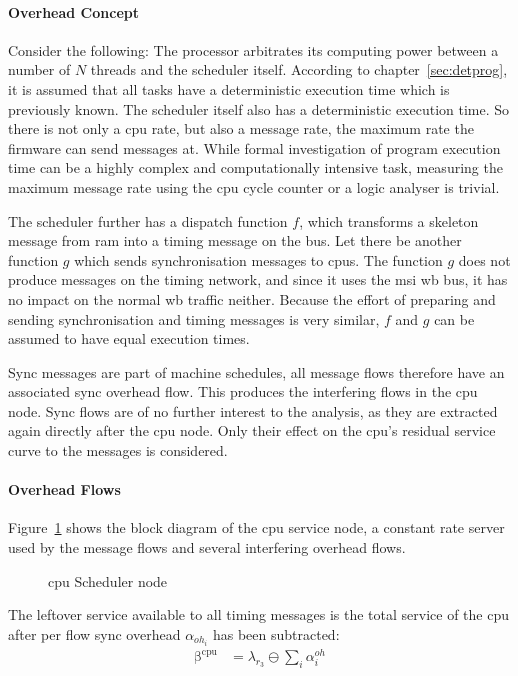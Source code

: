 \paragraph{Overhead Concept}
Consider the following: The processor arbitrates its computing power between a number of $N$ threads and the scheduler itself.
According to chapter~\ref{sec:detprog}, it is assumed that all tasks have a deterministic execution time which is previously known.
The scheduler itself also has a deterministic execution time.
So there is not only a \gls{cpu} rate, but also a message rate, the maximum rate the firmware can send messages at.
While formal investigation of program execution time can be a highly complex and computationally intensive task, measuring the maximum message rate using the \gls{cpu} cycle counter
or a logic analyser is trivial.
\par
The scheduler further has a dispatch function $f$, which transforms a skeleton message from \gls{ram}
into a timing message on the bus. Let there be another function $g$ which sends synchronisation messages to \gls{cpu}s.
The function $g$ does not produce messages on the timing network, and since it uses the \gls{msi} \gls{wb} bus, it has no impact on the normal \gls{wb} traffic neither.
Because the effort of preparing and sending synchronisation and timing messages is very similar, $f$ and $g$ can be assumed to have equal execution times.
\par
Sync messages are part of machine schedules, all message flows therefore have an associated sync overhead flow.
This produces the interfering flows in the \gls{cpu} node. Sync flows are of no further interest to the analysis, as they are extracted again directly after the \gls{cpu} node. Only their effect on the \gls{cpu}'s residual service curve to the messages is considered.
\paragraph{Overhead Flows}
Figure~\ref{fig:lm32-edf} shows the block diagram of the \gls{cpu} service node, a constant rate server used by the message flows and several interfering overhead flows.
%
\begin{figure}[H]
  \centering
  \def\svgwidth{0.25\textwidth}
  
  \caption{\gls{cpu} Scheduler node}
  \label{fig:lm32-edf}
\end{figure}
\noindent
The leftover service available to all timing messages is the total service of the \gls{cpu} after per flow sync overhead $\alpha_{{oh}_i}$ has been subtracted:
\begin{align}
\mathrm{\beta^{cpu}} &= \lambda_{r_3} \ominus \sum_i \alpha^{oh}_i
\label{eq:sched_cpu_serv}
\end{align}
%
